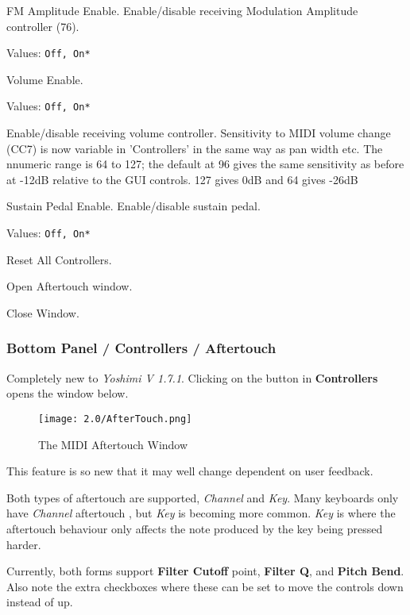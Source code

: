    FM Amplitude Enable.
   Enable/disable receiving Modulation Amplitude controller (76).

   Values: \texttt{Off, On*}

   Volume Enable.

   Values: \texttt{Off, On*}

   Enable/disable receiving volume controller.
   Sensitivity to MIDI volume change (CC7) is now variable in 'Controllers'
   in the same way as pan width etc. The nnumeric range is 64 to 127; the
   default at 96 gives the same sensitivity as before at -12dB relative to
   the GUI controls. 127 gives 0dB and 64 gives -26dB

   Sustain Pedal Enable.
   Enable/disable sustain pedal.

   Values: \texttt{Off, On*}

   Reset All Controllers.

   Open Aftertouch window.

   Close Window.

\subsubsection{Bottom Panel / Controllers / Aftertouch}
\label{subsubsec:bottom_panel_controllers_aftertouch}

   Completely new to \textsl{Yoshimi V 1.7.1}. Clicking on the button
   in \textbf{Controllers} opens the window below.

\begin{figure}[H]
   \centering
   \texttt{[image: 2.0/AfterTouch.png]}
   \caption{The MIDI Aftertouch Window}
   \label{fig:instrument_midi_aftertouch}
\end{figure}

This feature is so new that it may well change dependent on user feedback.

Both types of aftertouch are supported, \textsl{Channel} and \textsl{Key}. Many
keyboards only have \textsl{Channel} aftertouch , but \textsl{Key} is becoming
more common. \textsl{Key} is where the aftertouch
behaviour only affects the note produced by the key being pressed harder.

Currently, both forms support \textbf{Filter Cutoff} point,
\textbf{Filter Q}, and
\textbf{Pitch Bend}. Also note the extra checkboxes where these can be set to
move the controls down instead of up.

